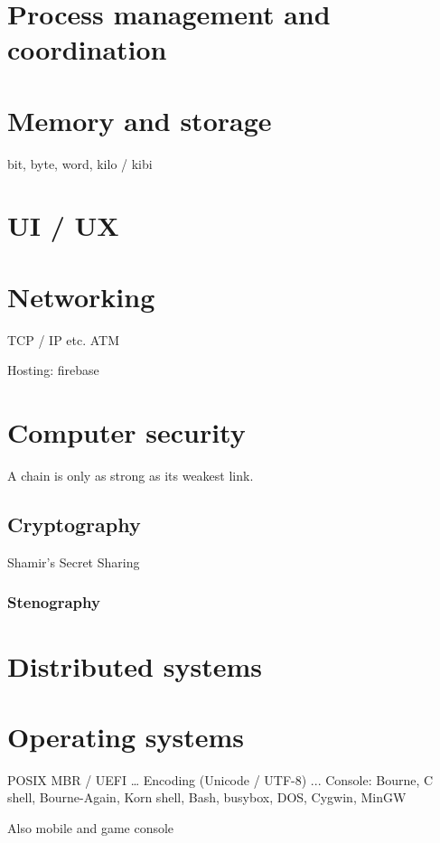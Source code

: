 \chapter{Process management and coordination}

\chapter{Memory and storage}
bit, byte, word, kilo / kibi

\chapter{UI / UX}

\chapter{Networking}
TCP / IP etc. ATM

Hosting: firebase

\chapter{Computer security}
A chain is only as strong as its weakest link.
\section{Cryptography}
Shamir's Secret Sharing
\subsection{Stenography}

\chapter{Distributed systems}

\chapter{Operating systems}
POSIX
MBR / UEFI
…
Encoding (Unicode / UTF-8)
...
Console: Bourne, C shell, Bourne-Again, Korn shell, Bash, busybox, DOS, Cygwin, MinGW

Also mobile and game console